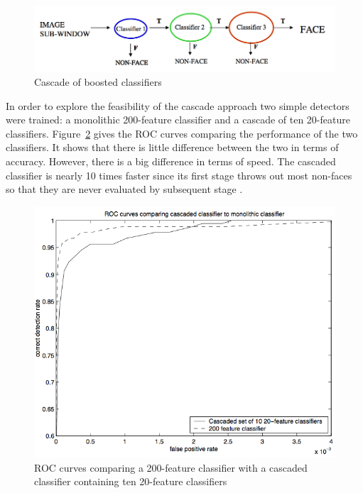 \begin{figure}[!h]
\begin{center}
\noindent \includegraphics[scale=0.5]{figures/haar_feature_cascade} 
\newline
\caption{Cascade of boosted classifiers}
\label{haar_feature_cascade}
\end{center} 
\end{figure}

\noindent In order to explore the feasibility of the cascade approach two simple detectors were trained: a monolithic 200-feature classifier and a cascade of ten 20-feature classifiers. Figure~\ref{haar_feature_cascade_example_result} gives the ROC curves comparing the performance of the two classifiers. It shows that there is little difference between the two in terms of accuracy. However, there is a big difference in terms of speed. The cascaded classifier is nearly 10 times faster since its first stage throws out most non-faces so that they are never evaluated by subsequent stage \cite{VIO01}.
\newline

\begin{figure}[!h]
\begin{center}
\noindent \includegraphics[scale=0.6]{figures/haar_feature_cascade_example_result} 
\newline
\caption{ROC curves comparing a 200-feature classifier with a cascaded classifier containing ten 20-feature classifiers}
\label{haar_feature_cascade_example_result}
\end{center} 
\end{figure}

